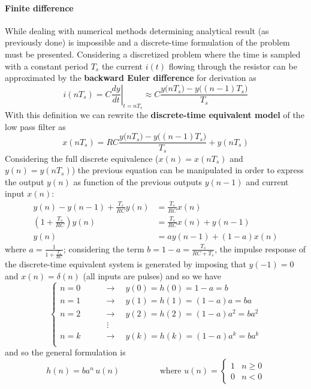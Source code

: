 		\paragraph{Finite difference} While dealing with numerical methods determining analytical result (as previously done) is impossible and a discrete-time formulation of the problem must be presented. Considering a discretized problem where the time is sampled with a constant period $T_s$ the current $i(t)$ flowing through the resistor can be approximated by the \textbf{backward Euler difference} for derivation as
		\begin{equation}
			i(nT_s) = C \left.\frac{dy}{dt}\right|_{t=nT_s} \approx C \frac{y\big(nT_s\big) - y\big((n-1)T_s\big) }{T_s}
		\end{equation}
		With this definition we can rewrite the \textbf{discrete-time equivalent model} of the low pass filter as
		\[ x(nT_s) = RC \frac{y\big(nT_s\big) - y\big((n-1)T_s\big) }{T_s} + y(nT_s) \]
		Considering the full discrete equivalence ($x(n) = x(nT_s)$ and $y(n) = y(nT_s)$) the previous equation can be manipulated in order to express the output $y(n)$ as function of the previous outputs $y(n-1)$ and current input $x(n)$:
		\begin{align*}
			y(n) - y(n-1) + \frac{T_s}{RC} y(n) & = \frac{T_s}{RC} x(n) \\
			\left(1 + \frac{T_s}{RC}\right) y(n) & = \frac{T_s}{RC} x(n) + y(n-1)\\
			y(n) & = a y(n-1) + (1-a) x(n)
		\end{align*}
		where $a = \frac{1}{1+ \frac{T_s}{RC}}$; considering the term $b = 1-a = \frac{T_s}{RC + T_s}$, the impulse response of the discrete-time equivalent system is generated by imposing that $y(-1) = 0$ and $x(n) = \delta(n)$ (all inputs are pulses) and so we have
		\[ \begin{cases}
			n = 0 \qquad  & \rightarrow \quad y(0) = h(0) = 1- a = b\\
			n = 1 \qquad  & \rightarrow \quad y(1) = h(1) = (1-a)a = ba\\
			n = 2 \qquad  & \rightarrow \quad y(2) = h(2) = (1-a)a^2 = ba^2\\
			& \hspace{4pt} \vdots \\
			n = k \qquad  & \rightarrow \quad y(k) = h(k) = (1-a)a^k = ba^k \\
		\end{cases} \]
		and so the general formulation is
		\begin{equation}
			h(n) = b a^n \, u(n) \hspace{2cm} \textrm{where } u(n) = \begin{cases}
				1 & n\geq 0 \\ 0 & n < 0
			\end{cases}
		\end{equation}
		
		
		
		
		
		
		
		
		
